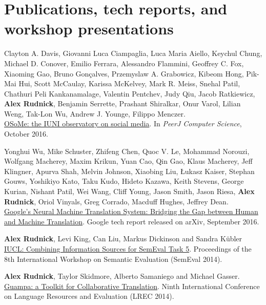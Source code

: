 \section*{Publications, tech reports, and workshop presentations}
\begin{itemize*}

\item
Clayton A. Davis, Giovanni Luca Ciampaglia, Luca Maria Aiello, Keychul Chung,
Michael D. Conover, Emilio Ferrara, Alessandro Flammini, Geoffrey C. Fox,
Xiaoming Gao, Bruno Gonçalves, Przemyslaw A.  Grabowicz, Kibeom Hong, Pik-Mai
Hui, Scott McCaulay, Karissa McKelvey, Mark R. Meiss, Snehal Patil, Chathuri
Peli Kankanamalage, Valentin Pentchev, Judy Qiu, Jacob Ratkiewicz, \textbf{Alex
Rudnick}, Benjamin Serrette, Prashant Shiralkar, Onur Varol, Lilian Weng,
Tak-Lon Wu, Andrew J. Younge, Filippo Menczer. \\
\href{https://peerj.com/articles/cs-87/}
{OSoMe: the IUNI observatory on social media}.
In \emph{PeerJ Computer Science}, October 2016.

\item
Yonghui Wu, Mike Schuster, Zhifeng Chen, Quoc V. Le, Mohammad Norouzi,
Wolfgang Macherey, Maxim Krikun, Yuan Cao, Qin Gao, Klaus Macherey, Jeff
Klingner, Apurva Shah, Melvin Johnson, Xiaobing Liu, Łukasz Kaiser, Stephan
Gouws, Yoshikiyo Kato, Taku Kudo, Hideto Kazawa, Keith Stevens, George Kurian,
Nishant Patil, Wei Wang, Cliff Young, Jason Smith, Jason Riesa, \textbf{Alex
Rudnick}, Oriol Vinyals, Greg Corrado, Macduff Hughes, Jeffrey Dean. \\
\href{https://arxiv.org/abs/1609.08144}
{Google's Neural Machine Translation System: Bridging the Gap between
Human and Machine Translation}.
Google tech report released on arXiv, September 2016.

\item
\textbf{Alex Rudnick}, Levi King, Can Liu, Markus Dickinson and Sandra Kübler
\\
\href{http://alt.qcri.org/semeval2014/cdrom/pdf/SemEval2014060.pdf}
{IUCL: Combining Information Sources for SemEval Task 5}.
Proceedings of the 8th International Workshop on Semantic Evaluation
(SemEval 2014).

\item
\textbf{Alex Rudnick}, Taylor Skidmore, Alberto Samaniego and Michael Gasser.\\
\href{http://www.lrec-conf.org/proceedings/lrec2014/summaries/151.html}
{Guampa: a Toolkit for Collaborative Translation}.
Ninth International Conference on Language Resources and Evaluation (LREC
2014).


\end{itemize*}
